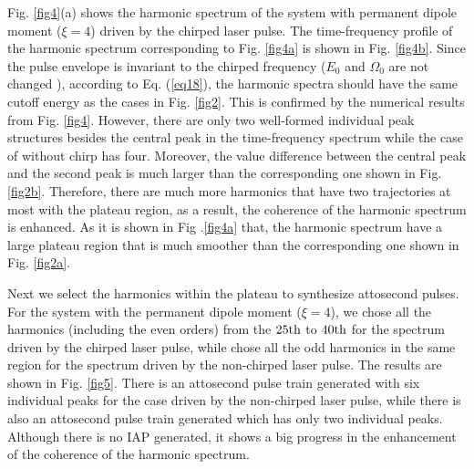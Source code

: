 \documentclass[10pt,letterpaper]{article}
\begin{document}
Fig. \ref{fig4}(a) shows the harmonic spectrum of the system with permanent dipole moment ($ \xi=4 $) driven by the chirped laser pulse. The time-frequency profile of the harmonic spectrum corresponding to Fig. \ref{fig4a} is shown in Fig. \ref{fig4b}. Since the pulse envelope is invariant to the chirped frequency ($ E_{0} $ and $ \Omega_{0} $ are not changed ), according to Eq. (\ref{eq18}), the harmonic spectra should have the same cutoff energy as the cases in Fig. \ref{fig2}. This is confirmed by the numerical results from Fig. \ref{fig4}. However, there are only two well-formed individual peak structures besides the central peak in the time-frequency spectrum while the case of without chirp has four. Moreover, the value difference between the central peak and the second peak is much larger than the corresponding one shown in Fig. \ref{fig2b}. Therefore, there are much more harmonics that have two trajectories at most with the plateau region, as a result, the coherence of the harmonic spectrum is enhanced. As it is shown in Fig .\ref{fig4a} that, the harmonic spectrum have a large plateau region that is much smoother than the corresponding one shown in Fig. \ref{fig2a}. 

Next we select the harmonics within the plateau to synthesize attosecond pulses. For the system with the permanent dipole moment ($ \xi=4 $), we chose all the harmonics (including the even orders) from the $ 25\rm{th} $ to $ 40\rm{th} $ for the spectrum driven by the chirped laser pulse, while chose all the odd harmonics in the same region for the spectrum driven by the non-chirped laser pulse. The results are shown in Fig. \ref{fig5}. There is an attosecond pulse train generated with six individual peaks for the case driven by the non-chirped laser pulse, while there is also an attosecond pulse train generated which has only two individual peaks. Although there is no IAP generated, it shows a big progress in the enhancement of the coherence of the harmonic spectrum. 
\end{document}
